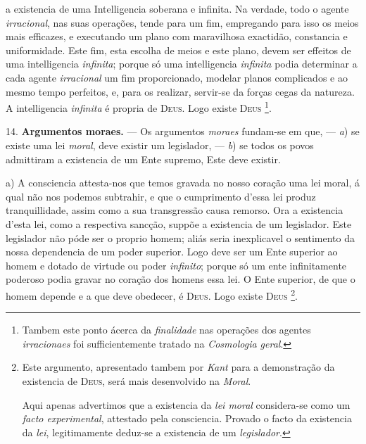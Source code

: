  a existencia de uma Intelligencia soberana e infinita. Na verdade, todo o agente \emph{irracional}, nas suas operações, tende para um fim, empregando para isso os meios mais efficazes, e executando um plano com maravilhosa exactidão, constancia e uniformidade. Este fim, esta escolha de meios e este plano, devem ser effeitos de uma intelligencia \emph{infinita}; porque só uma intelligencia \emph{infinita} podia determinar a cada agente \emph{irracional} um fim proporcionado, modelar planos complicados e ao mesmo tempo perfeitos, e, para os realizar, servir-se da forças cegas da natureza. A intelligencia \emph{infinita} é propria de \textsc{Deus}. Logo existe \textsc{Deus} \footnote{Tambem este ponto ácerca da \emph{finalidade} nas operações dos agentes \emph{irracionaes} foi sufficientemente tratado na \emph{Cosmologia geral}.}.

14. \textbf{Argumentos moraes.} --- Os argumentos \emph{moraes} fundam-se em que, --- \emph{a}) se existe uma lei \emph{moral}, deve existir um legislador, --- \emph{b}) se todos os povos admittiram a existencia de um Ente supremo, Este deve existir.

a) A consciencia attesta-nos que temos gravada no nosso coração uma lei moral, á qual não nos podemos subtrahir, e que o cumprimento d'essa lei produz tranquillidade, assim como a sua transgressão causa remorso. Ora a existencia d'esta lei, como a respectiva sancção, suppõe a existencia de um legislador. Este legislador não póde ser o proprio homem; aliás seria inexplicavel o sentimento da nossa dependencia de um poder superior. Logo deve ser um Ente superior ao homem e dotado de virtude ou poder \emph{infinito}; porque só um ente infinitamente poderoso podia gravar no coração dos homens essa lei. O Ente superior, de que o homem depende e a que deve obedecer, é \textsc{Deus}. Logo existe \textsc{Deus} \footnote{Este argumento, apresentado tambem por \emph{Kant} para a demonstração da existencia de \textsc{Deus}, será mais desenvolvido na \emph{Moral}.\par Aqui apenas advertimos que a existencia da \emph{lei moral} considera-se como um \emph{facto experimental}, attestado pela consciencia. Provado o facto da existencia da \emph{lei}, legitimamente deduz-se a existencia de um \emph{legislador}.}.
